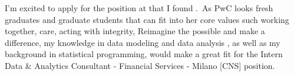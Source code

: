 



I'm excited to apply for the \position\;position at \company\;that I found \source. 
\companynews\,As PwC looks fresh graduates and graduate students that can fit into her core values such working together, care, acting with integrity, Reimagine the possible and make a difference, my knowledge in data modeling and data analysis , as well as my background in statistical programming, would make a great fit for the Intern Data & Analytics Consultant - Financial Services - Milano [CNS]  position.
